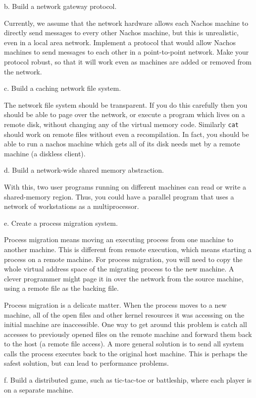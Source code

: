 \begin{description}
\begin{description}
\item{b.} Build a network gateway protocol.

Currently, we assume that
the network hardware allows each Nachos machine to directly send messages to
every other Nachos machine, but this is unrealistic, even in a local
area network.  Implement a protocol that would allow Nachos
machines to send messages to each other in a point-to-point network.
Make your protocol robust, so that it will work even as machines
are added or removed from the network.

\item{c.} Build a caching network file system.

The network file system should be transparent.  If you do this carefully
then you should be able to page over the network, or execute a program
which lives on a remote disk, without changing any of the virtual
memory code.  Similarly {\tt cat} should work on remote files without
even a recompilation.  In fact, you should be able to run a nachos machine
which gets all of its disk needs met by a remote machine (a diskless
client).

\item{d.} Build a network-wide shared memory abstraction.

With this, two user programs running on different machines can
read or write a shared-memory region.  Thus, you could have a parallel
program that uses a network of workstations as a multiprocessor.

\item{e.} Create a process migration system.

Process migration means moving an executing process from one machine
to another machine.  This is different from remote execution, which means
starting a process on a remote machine.  For process migration, you will
need to copy the whole virtual address space of the migrating process
to the new machine.  A clever programmer might page it in over
the network from the source machine, using a remote file as the
backing file.

Process migration is a delicate matter.  When the process moves to a
new machine, all of the open files and other kernel resources it
was accessing on the initial machine are inaccessible.  One way to
get around this problem is catch all accesses to previously opened
files on the remote machine and forward them back to the host (a remote
file access).  A more general solution is to send all system calls the
process executes back to the original host machine.  This is perhaps the
safest solution, but can lead to performance problems.

\item{f.} Build a distributed game, such as tic-tac-toe or battleship,
where each player is on a separate machine.

\end{description}
\end{description}


